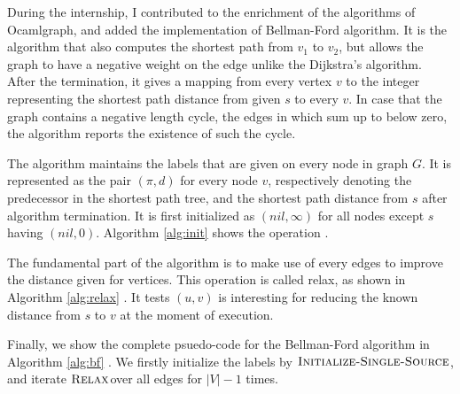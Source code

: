 \documentclass[a4paper,12pt]{article}
\begin{document}
During the internship, I contributed to the enrichment of the
algorithms of Ocamlgraph, and added the implementation of Bellman-Ford
algorithm. It is the algorithm that also computes the shortest path
from $v_1$ to $v_2$, but allows the graph to have a negative weight on
the edge unlike the Dijkstra's algorithm. After the termination, it
gives a mapping from every vertex $v$ to the integer representing the
shortest path distance from given $s$ to every $v$. In case that the
graph contains a negative length cycle, the edges in which sum up to
below zero, the algorithm reports the existence of such the cycle.

The algorithm maintains the labels that are given on every node in
graph $G$. It is represented as the pair $(\pi,d)$ for every node $v$,
respectively denoting the predecessor in the shortest path tree, and
the shortest path distance from $s$ after algorithm termination. It is
first initialized as $(nil,\infty)$ for all nodes except $s$ having
$(nil,0)$. Algorithm \ref{alg:init} shows the operation \cite{algo}.

\newcommand{\initBF}{\ensuremath{\mbox{\sc Initialize-Single-Source}}}
\begin{algorithm}
\caption{$\initBF(G,s)$}\label{alg:init}
\begin{algorithmic}[1]
\ENDFOR
{}
\end{algorithmic}
\end{algorithm}

The fundamental part of the algorithm is to make use of every edges to
improve the distance given for vertices. This operation is called
relax, as shown in Algorithm \ref{alg:relax} \cite{algo}. It tests
$(u,v)$ is interesting for reducing the known distance from $s$ to $v$
at the moment of execution.

\newcommand{\relaxBF}{\ensuremath{\mbox{\sc Relax}}}
\begin{algorithm}
\caption{$\relaxBF(u,v,l)$}\label{alg:relax}
\begin{algorithmic}[1]
\ENDIF
\end{algorithmic}
\end{algorithm}

Finally, we show the complete psuedo-code for the Bellman-Ford
algorithm in Algorithm \ref{alg:bf} \cite{algo}. We firstly initialize
the labels by \initBF, and iterate \relaxBF over all edges for $|V|-1$
times.
\end{document}
